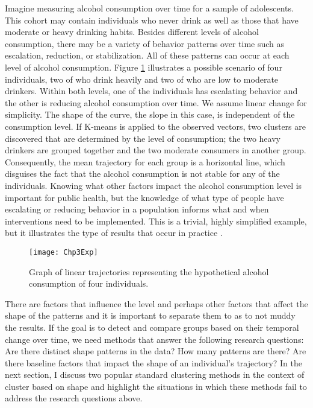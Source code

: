 Imagine measuring alcohol consumption over time for a sample of adolescents. This cohort may contain individuals who never drink as well as those that have moderate or heavy drinking habits. Besides different levels of alcohol consumption, there may be a variety of behavior patterns over time such as escalation, reduction, or stabilization. All of these patterns can occur at each level of alcohol consumption. Figure \ref{fig:3-1} illustrates a possible scenario of four individuals, two of who drink heavily and two of who are low to moderate drinkers. Within both levels, one of the individuals has escalating behavior and the other is reducing alcohol consumption over time. We assume linear change for simplicity. The shape of the curve, the slope in this case, is independent of the consumption level. If K-means is applied to the observed vectors, two clusters are discovered that are determined by the level of consumption; the two heavy drinkers are grouped together and the two moderate consumers in another group. Consequently, the mean trajectory for each group is a horizontal line, which disguises the fact that the alcohol consumption is not stable for any of the individuals. Knowing what other factors impact the alcohol consumption level is important for public health, but the knowledge of what type of people have escalating or reducing behavior in a population informs what and when interventions need to be implemented. This is a trivial, highly simplified example, but it illustrates the type of results that occur in practice \cite{mccoy2010}.

\begin{figure}
\begin{center}
\texttt{[image: Chp3Exp]}
\end{center}
\caption{Graph of linear trajectories representing the hypothetical alcohol consumption of four individuals.}
\label{fig:3-1}
\end{figure}

There are factors that influence the level and perhaps other factors that affect the shape of the patterns and it is important to separate them to as to not muddy the results. If the goal is to detect and compare groups based on their temporal change over time, we need methods that answer the following research questions: Are there distinct shape patterns in the data? How many patterns are there? Are there baseline factors that impact the shape of an individual's trajectory? In the next section, I discuss two popular standard clustering methods in the context of cluster based on shape and highlight the situations in which these methods fail to address the research questions above. 

